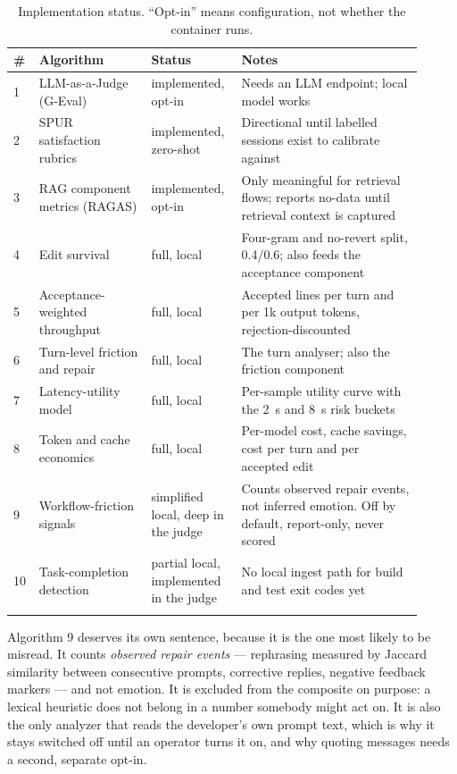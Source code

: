 \documentclass[11pt,a4paper]{article}
\begin{document}
\begin{longtable}{@{}p{0.03\linewidth}p{0.26\linewidth}p{0.20\linewidth}p{0.42\linewidth}@{}}
\toprule
\textbf{\#} & \textbf{Algorithm} & \textbf{Status} & \textbf{Notes} \\
\midrule
\endhead
1 & LLM-as-a-Judge (G-Eval) & implemented, opt-in & Needs an LLM endpoint; local
model works \\
2 & SPUR satisfaction rubrics & implemented, zero-shot & Directional until
labelled sessions exist to calibrate against \\
3 & RAG component metrics (RAGAS) & implemented, opt-in & Only meaningful for
retrieval flows; reports no-data until retrieval context is captured \\
4 & Edit survival & full, local & Four-gram and no-revert split, 0.4/0.6; also
feeds the acceptance component \\
5 & Acceptance-weighted throughput & full, local & Accepted lines per turn and
per 1k output tokens, rejection-discounted \\
6 & Turn-level friction and repair & full, local & The turn analyser; also the
friction component \\
7 & Latency-utility model & full, local & Per-sample utility curve with the 2~s
and 8~s risk buckets \\
8 & Token and cache economics & full, local & Per-model cost, cache savings,
cost per turn and per accepted edit \\
9 & Workflow-friction signals & simplified local, deep in the judge & Counts
observed repair events, not inferred emotion. Off by default, report-only,
never scored \\
10 & Task-completion detection & partial local, implemented in the judge & No
local ingest path for build and test exit codes yet \\
\bottomrule
\caption{Implementation status. ``Opt-in'' means configuration, not whether the
container runs.}
\end{longtable}

Algorithm 9 deserves its own sentence, because it is the one most likely to be
misread. It counts \emph{observed repair events} --- rephrasing measured by
Jaccard similarity between consecutive prompts, corrective replies, negative
feedback markers --- and not emotion. It is excluded from the composite on
purpose: a lexical heuristic does not belong in a number somebody might act on.
It is also the only analyzer that reads the developer's own prompt text, which
is why it stays switched off until an operator turns it on, and why quoting
messages needs a second, separate opt-in.
\end{document}
